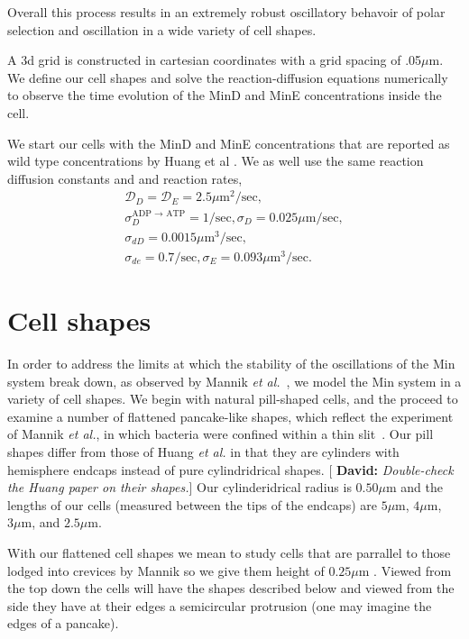\documentclass[letterpaper,twocolumn,amsmath,amssymb,pre]{revtex4-1}
\newcommand{\green}[1]{{\bf \color{green} #1}}
\newcommand{\davidsays}[1]{{\color{red} [\green{David:} \emph{#1}]}}
\newcommand\micron{\ensuremath{\mu\text{m}}}
\begin{document}
Overall this process results in an extremely robust oscillatory
behavoir of polar selection and oscillation in a wide variety of cell
shapes.



 A 3d grid is constructed in cartesian
coordinates with a grid spacing of .05\micron. We define our cell
shapes and solve the reaction-diffusion equations numerically to
observe the time evolution of the MinD and MinE concentrations inside
the cell.

We start our cells with the MinD and MinE concentrations that are
reported as wild type concentrations by Huang et al . We as well use the same reaction
diffusion constants and and reaction rates,
\begin{gather*} %
  \mathcal{D}_D = \mathcal{D}_{E}  = 2.5 \micron^2/\text{sec}, \\
  \sigma_D^{\textrm{ADP $\rightarrow$ ATP}}  = 1/\textrm{sec},  \sigma_D = 0.025 \micron /\textrm{sec}, \\
  \sigma_{dD}  = 0.0015 \micron^3/ \textrm{sec}, \\
  \sigma_{de}  = 0.7/\textrm{sec}, \sigma_E = 0.093 \micron^3 /\textrm{sec}.
\end{gather*}

\section{Cell shapes}

In order to address the limits at which the stability of the
oscillations of the Min system break down, as observed by Mannik
\emph{et al.}~\cite{mannik2012robustness}, we model the Min system in
a variety of cell shapes.  We begin with natural pill-shaped cells,
and the proceed to examine a number of flattened pancake-like shapes,
which reflect the experiment of Mannik \emph{et al.}, in which
bacteria were confined within a thin slit~\cite{mannik2012robustness}.
Our pill shapes differ from those of Huang \emph{et al.} in that they
are cylinders with hemisphere endcaps instead of pure cylindridrical
shapes. \davidsays{Double-check the Huang paper on their shapes.}  Our
cylinderidrical radius is $0.50\micron$ and the lengths of our cells
(measured between the tips of the endcaps) are $5\micron$, $4\micron$, $3\micron$,
and $2.5\micron$.

With our flattened cell shapes we mean to study cells that are
parrallel to those lodged into crevices by Mannik so we give them
height of $0.25\micron$ \cite{mannik2012robustness}.  Viewed from the top
down the cells will have the shapes described below and viewed from
the side they have at their edges a semicircular protrusion (one may
imagine the edges of a pancake).
\end{document}
